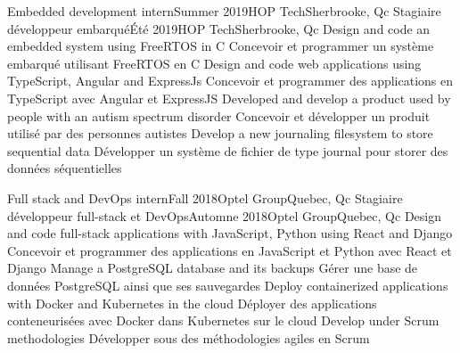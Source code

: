         \resumeSubheadingEnFr
          {Embedded development intern}{Summer 2019}{HOP Tech}{Sherbrooke, Qc}
          {Stagiaire développeur embarqué}{Été 2019}{HOP Tech}{Sherbrooke, Qc}
                \resumeItemListStart
                    \resumeItemEnFr
                        {Design and code an embedded system using FreeRTOS in C}
                        {Concevoir et programmer un système embarqué utilisant FreeRTOS en C}
                    \resumeItemEnFr
                        {Design and code web applications using TypeScript, Angular and ExpressJs}
                        {Concevoir et programmer des applications en TypeScript avec Angular et ExpressJS}
                    \resumeItemEnFr
                        {Developed and develop a product used by people with an autism spectrum disorder}
                        {Concevoir et développer un produit utilisé par des personnes autistes}
                    \resumeItemEnFr
                        {Develop a new journaling filesystem to store sequential data}
                        {Développer un système de fichier de type journal pour storer des données séquentielles}
                \resumeItemListEnd
    
        \resumeSubheadingEnFr
          {Full stack and DevOps intern}{Fall 2018}{Optel Group}{Quebec, Qc}
          {Stagiaire développeur full-stack et DevOps}{Automne 2018}{Optel Group}{Quebec, Qc}
                \resumeItemListStart
                    \resumeItemEnFr
                        {Design and code full-stack applications with JavaScript, Python using React and Django}
                        {Concevoir et programmer des applications en JavaScript et Python avec React et Django}
                    \resumeItemEnFr
                        {Manage a PostgreSQL database and its backups}
                        {Gérer une base de données PostgreSQL ainsi que ses sauvegardes}
                    \resumeItemEnFr
                        {Deploy containerized applications with Docker and Kubernetes in the cloud}
                        {Déployer des applications conteneurisées avec Docker dans Kubernetes sur le cloud}
                    \resumeItemEnFr
                        {Develop under Scrum methodologies}
                        {Développer sous des méthodologies agiles en Scrum}
                \resumeItemListEnd
    \resumeSubHeadingListEnd

